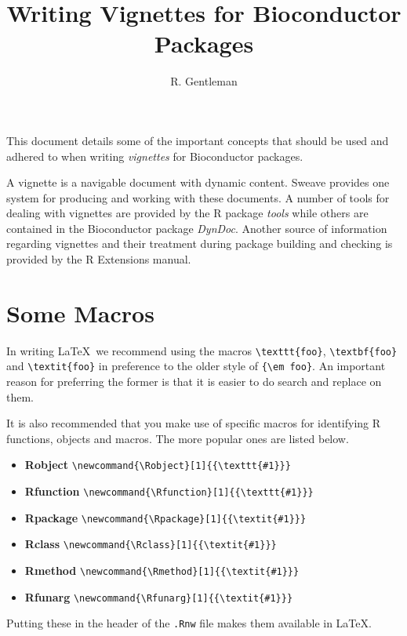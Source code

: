 \documentclass{article}
\newcommand{\Rfunction}[1]{{\texttt{#1}}}
\newcommand{\Robject}[1]{{\texttt{#1}}}
\newcommand{\Rpackage}[1]{{\textit{#1}}}
\newcommand{\Rclass}[1]{{\textit{#1}}}
\newcommand{\Rmethod}[1]{{\textit{#1}}}
\newcommand{\Rfunarg}[1]{{\textit{#1}}}
\begin{document}

\title{Writing Vignettes for Bioconductor Packages}
\author{R. Gentleman}
\maketitle{}


This document details some of the important concepts that should be
used and adhered to when writing \textit{vignettes} for Bioconductor
packages. 

A vignette is a navigable document with dynamic content. Sweave
\citep{Leisch2002} provides one system for producing and working with
these documents. A number of tools for dealing with vignettes are
provided by the R package \Rpackage{tools} while others are contained
in the Bioconductor package \Rpackage{DynDoc}. Another source of
information regarding vignettes and their treatment during package
building and checking is provided by the R Extensions manual.

\section*{Some Macros}

In writing \LaTeX\ we recommend using the macros \verb+\texttt{foo}+,
\verb+\textbf{foo}+ and \verb+\textit{foo}+ in preference to the older
style of  \verb+{\em foo}+. An important reason for preferring the
former is that it is easier to do search and replace on them.

It is also recommended that you make use of specific macros for
identifying R functions, objects and macros. The more popular ones are
listed below.
\begin{itemize}
\item \textbf{Robject} \verb+\newcommand{\Robject}[1]{{\texttt{#1}}}+
\item \textbf{Rfunction}
  \verb+\newcommand{\Rfunction}[1]{{\texttt{#1}}}+
\item \textbf{Rpackage} \verb+\newcommand{\Rpackage}[1]{{\textit{#1}}}+
\item \textbf{Rclass} \verb+\newcommand{\Rclass}[1]{{\textit{#1}}}+
\item \textbf{Rmethod} \verb+\newcommand{\Rmethod}[1]{{\textit{#1}}}+
\item \textbf{Rfunarg} \verb+\newcommand{\Rfunarg}[1]{{\textit{#1}}}+
\end{itemize}

Putting these in the header of the \texttt{.Rnw} file makes them
available in \LaTeX.
\end{document}
